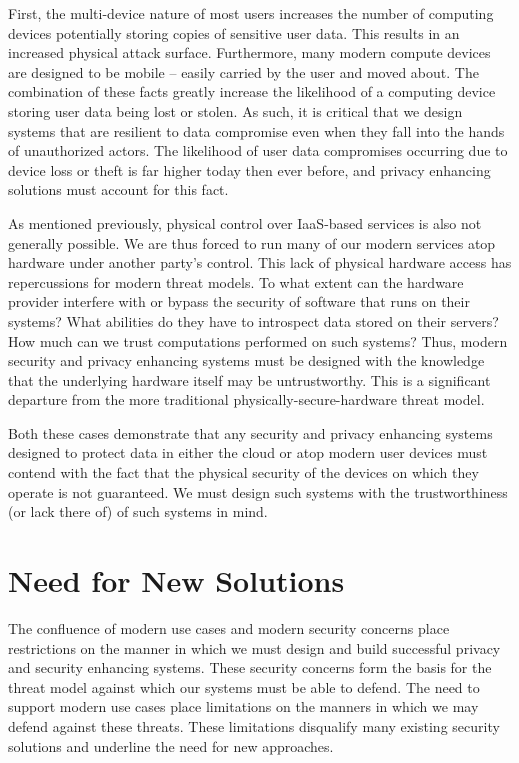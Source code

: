 First, the multi-device nature of most users increases the number of
computing devices potentially storing copies of sensitive user
data. This results in an increased physical attack
surface. Furthermore, many modern compute devices are designed to be
mobile -- easily carried by the user and moved about. The combination
of these facts greatly increase the likelihood of a computing device
storing user data being lost or stolen. As such, it is critical that we
design systems that are resilient to data compromise even when they
fall into the hands of unauthorized actors. The likelihood of user
data compromises occurring due to device loss or theft is far higher
today then ever before, and privacy enhancing solutions must account
for this fact.

As mentioned previously, physical control over IaaS-based services is
also not generally possible. We are thus forced to run many of our
modern services atop hardware under another party's control. This lack
of physical hardware access has repercussions for modern threat
models. To what extent can the hardware provider interfere with or
bypass the security of software that runs on their systems? What
abilities do they have to introspect data stored on their servers? How
much can we trust computations performed on such systems?  Thus,
modern security and privacy enhancing systems must be designed with
the knowledge that the underlying hardware itself may be
untrustworthy. This is a significant departure from the more
traditional physically-secure-hardware threat model.

Both these cases demonstrate that any security and privacy enhancing
systems designed to protect data in either the cloud or atop modern
user devices must contend with the fact that the physical security of
the devices on which they operate is not guaranteed. We must design
such systems with the trustworthiness (or lack there of) of such
systems in mind.

\section{Need for New Solutions}
\label{chap:challenges:solutions}

The confluence of modern use cases and modern security concerns place
restrictions on the manner in which we must design and build
successful privacy and security enhancing systems. These security
concerns form the basis for the threat model against which our systems
must be able to defend. The need to support modern use cases place
limitations on the manners in which we may defend against these
threats. These limitations disqualify many existing security solutions
and underline the need for new approaches.

